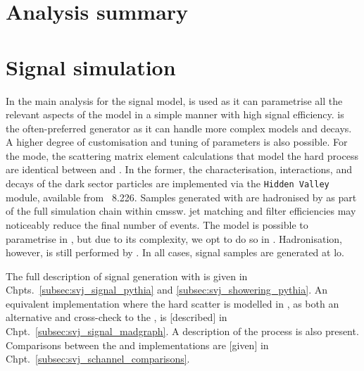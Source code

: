 



\section{Analysis summary}
\label{sec:svj_overview}




\section{Signal simulation}
\label{sec:signal_sim}

In the main analysis for the \schannel signal model, \PYTHIA is used as it can parametrise all the relevant aspects of the model in a simple manner with high signal efficiency. \MADGRAPH is the often-preferred generator as it can handle more complex models and decays. A higher degree of customisation and tuning of parameters is also possible. For the \schannel mode, the scattering matrix element calculations that model the hard process are identical between \PYTHIA and \MADGRAPH. In the former, the characterisation, interactions, and decays of the dark sector particles are implemented via the \texttt{Hidden Valley} module, available from \PYTHIA~8.226. Samples generated with \MADGRAPH are hadronised by \PYTHIA as part of the full simulation chain within \acrshort{cmssw}. \Gls{jet} matching and filter efficiencies may noticeably reduce the final number of events. The \tchannel model is possible to parametrise in \PYTHIA, but due to its complexity, we opt to do so in \MADGRAPH. Hadronisation, however, is still performed by \PYTHIA. In all cases, signal samples are generated at \acrfull{lo}.


The full description of \schannel signal generation with \PYTHIAEIGHT is given in Chpts.~\ref{subsec:svj_signal_pythia} and \ref{subsec:svj_showering_pythia}. An equivalent implementation where the hard scatter is modelled in \MGvATNLO, as both an alternative and cross-check to the \PYTHIA [version], is [described] in Chpt.~\ref{subsec:svj_signal_madgraph}. A description of the \tchannel process is also present. Comparisons between the \PYTHIA and \MADGRAPH implementations are [given] in Chpt.~\ref{subsec:svj_schannel_comparisons}.

